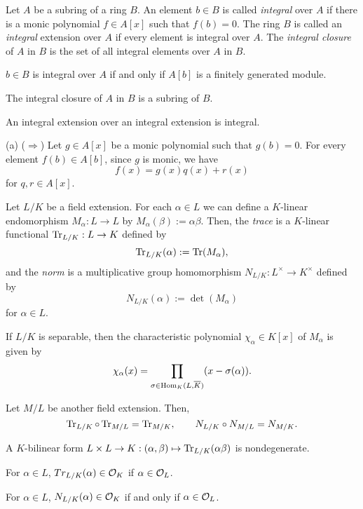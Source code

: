 \documentclass{../../large}
\begin{document}
\begin{prb}
Let $A$ be a subring of a ring $B$.
An element $b\in B$ is called \emph{integral} over $A$ if there is a monic polynomial $f\in A[x]$ such that $f(b)=0$.
The ring $B$ is called an \emph{integral} extension over $A$ if every element is integral over $A$.
The \emph{integral closure} of $A$ in $B$ is the set of all integral elements over $A$ in $B$.
\begin{parts}
\item $b\in B$ is integral over $A$ if and only if $A[b]$ is a finitely generated module.
\item The integral closure of $A$ in $B$ is a subring of $B$.
\item An integral extension over an integral extension is integral.
\end{parts}
\end{prb}
\begin{pf}
(a)
($\Rightarrow$)
Let $g\in A[x]$ be a monic polynomial such that $g(b)=0$.
For every element $f(b)\in A[b]$, since $g$ is monic, we have
\[f(x)=g(x)q(x)+r(x)\]
for $q,r\in A[x]$.
\end{pf}


\begin{prb}
Let $L/K$ be a field extension.
For each $\alpha\in L$ we can define a $K$-linear endomorphism $M_\alpha:L\to L$ by $M_\alpha(\beta):=\alpha\beta$.
Then, the \emph{trace} is a $K$-linear functional $\operatorname{Tr}_{L/K}:L\to K$ defined by
\[\operatorname{Tr}_{L/K}(\alpha):=\operatorname{Tr}(M_\alpha),\]
and the \emph{norm} is a multiplicative group homomorphism $N_{L/K}:L^\times\to K^\times$ defined by
\[N_{L/K}(\alpha):=\det(M_\alpha)\]
for $\alpha\in L$.
\begin{parts}
\item If $L/K$ is separable, then the characteristic polynomial $\chi_\alpha\in K[x]$ of $M_\alpha$ is given by
\[\chi_\alpha(x)=\prod_{\sigma\in\operatorname{Hom}_K(L,\overline K)}(x-\sigma(\alpha)).\]
\item Let $M/L$ be another field extension. Then,
\[\operatorname{Tr}_{L/K}\circ\operatorname{Tr}_{M/L}=\operatorname{Tr}_{M/K},\qquad N_{L/K}\circ N_{M/L}=N_{M/K}.\]
\item A $K$-bilinear form $L\times L\to K:(\alpha,\beta)\mapsto\operatorname{Tr}_{L/K}(\alpha\beta)$ is nondegenerate.
\item For $\alpha\in L$, $Tr_{L/K}(\alpha)\in\mathcal{O}_K$ if $\alpha\in\mathcal{O}_L$.
\item For $\alpha\in L$, $N_{L/K}(\alpha)\in\mathcal{O}_K$ if and only if $\alpha\in\mathcal{O}_L$.
\end{parts}
\end{prb}
\end{document}
